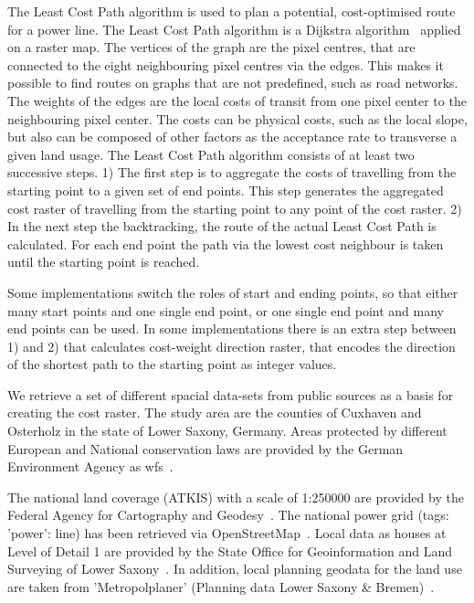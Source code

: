 
The Least Cost Path algorithm is used to plan a potential, cost-optimised route for a power line.
The Least Cost Path algorithm is a Dijkstra algorithm~\cite{dijkstra_note_1959} applied on a raster map.
The vertices of the graph are the pixel centres, that are connected to the eight neighbouring pixel centres via the edges.
This makes it possible to find routes on graphs that are not predefined, such as road networks.
The weights of the edges are the local costs of transit from one pixel center to the neighbouring pixel center.
The costs can be physical costs, such as the local slope, but also can be composed of other factors as the acceptance rate to transverse a given land usage.
The Least Cost Path algorithm consists of at least two successive steps.
1) The first step is to aggregate the costs of travelling from the starting point to a given set of end points.
This step generates the aggregated cost raster of travelling from the starting point to any point of the cost raster.
2) In the next step the backtracking, the route of the actual Least Cost Path is calculated.
For each end point the path via the lowest cost neighbour is taken until the starting point is reached.

Some implementations switch the roles of start and ending points, so that either many start points and one single end point, or one single end point and many end points can be used.
In some implementations there is an extra step between 1) and 2) that calculates cost-weight direction raster, that encodes the direction of the shortest
path to the starting point as integer values.

We retrieve a set of different spacial data-sets from  public sources as a basis for creating the cost raster.
The study area are the counties of Cuxhaven and Osterholz in the state of Lower Saxony, Germany.
Areas protected by different European and National conservation laws are provided by the German Environment Agency
as \acrfull{wfs}~\cite{noauthor_schutzgebiete_2015}.

The national land coverage (ATKIS) with a scale of 1:250000 are provided by the Federal Agency for Cartography
and Geodesy~\cite{noauthor_digitales_2021}.
The national power grid (tags: 'power': line) has been retrieved via OpenStreetMap~\cite{boeing_osmnx_2017}.
Local data as houses at Level of Detail 1 are provided by the State Office for Geoinformation and Land Surveying of
Lower Saxony~\cite{noauthor_opengeodatani_2022}.
In addition, local planning geodata for the land use are taken
from 'Metropolplaner' (Planning data Lower Saxony \& Bremen)~\cite{noauthor_metropolplaner_2022}.

